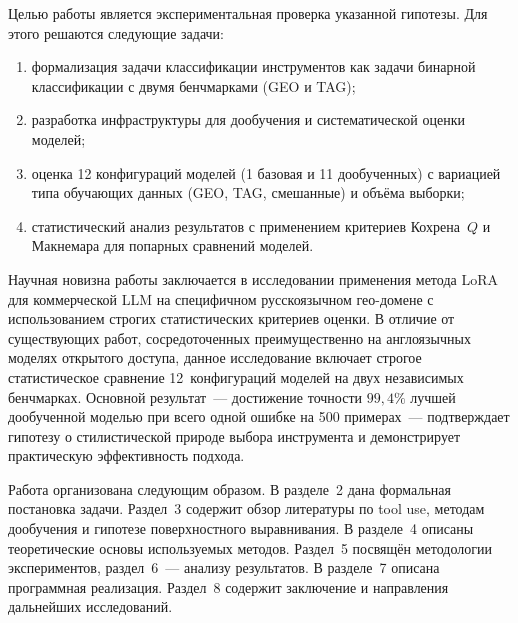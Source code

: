 Целью работы является экспериментальная проверка указанной гипотезы. Для этого решаются следующие задачи:
\begin{enumerate}
    \item формализация задачи классификации инструментов как задачи бинарной классификации с двумя бенчмарками (GEO и TAG);
    \item разработка инфраструктуры для дообучения и систематической оценки моделей;
    \item оценка 12 конфигураций моделей (1 базовая и 11 дообученных) с вариацией типа обучающих данных (GEO, TAG, смешанные) и объёма выборки;
    \item статистический анализ результатов с применением критериев Кохрена~$Q$ и Макнемара для попарных сравнений моделей.
\end{enumerate}

Научная новизна работы заключается в исследовании применения метода LoRA для коммерческой LLM на специфичном русскоязычном гео-домене с использованием строгих статистических критериев оценки. В отличие от существующих работ, сосредоточенных преимущественно на англоязычных моделях открытого доступа, данное исследование включает строгое статистическое сравнение 12~конфигураций моделей на двух независимых бенчмарках. Основной результат~--- достижение точности $99{,}4\%$ лучшей дообученной моделью при всего одной ошибке на 500 примерах~--- подтверждает гипотезу о стилистической природе выбора инструмента и демонстрирует практическую эффективность подхода.

Работа организована следующим образом. В разделе~2 дана формальная постановка задачи. Раздел~3 содержит обзор литературы по tool use, методам дообучения и гипотезе поверхностного выравнивания. В разделе~4 описаны теоретические основы используемых методов. Раздел~5 посвящён методологии экспериментов, раздел~6~--- анализу результатов. В разделе~7 описана программная реализация. Раздел~8 содержит заключение и направления дальнейших исследований.
